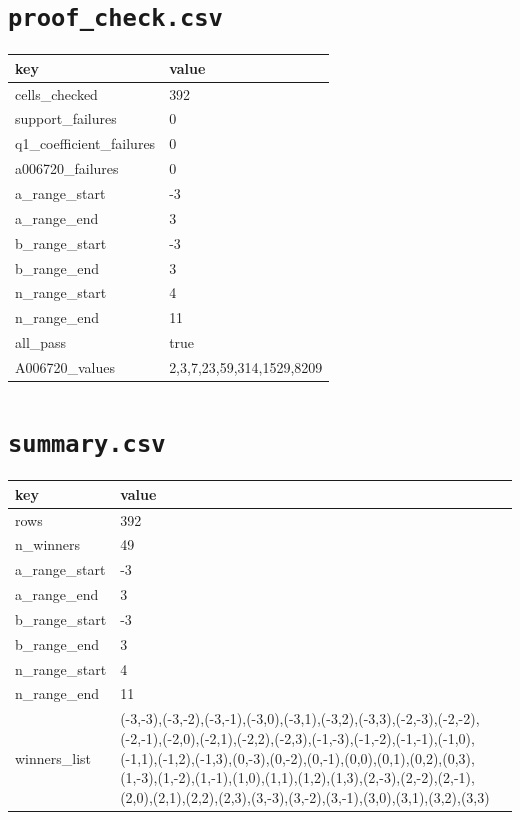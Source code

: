 \documentclass[10pt]{article}
\begin{document}
\section*{\texttt{proof\_check.csv}}
{\footnotesize
\begin{longtable}{@{}ll@{}}
\toprule
\textbf{key} & \textbf{value} \\
\midrule\endhead
cells\_checked & 392 \\
support\_failures & 0 \\
q1\_coefficient\_failures & 0 \\
a006720\_failures & 0 \\
a\_range\_start & -3 \\
a\_range\_end & 3 \\
b\_range\_start & -3 \\
b\_range\_end & 3 \\
n\_range\_start & 4 \\
n\_range\_end & 11 \\
all\_pass & true \\
A006720\_values & 2,3,7,23,59,314,1529,8209 \\
\bottomrule
\end{longtable}}


\section*{\texttt{summary.csv}}
{\footnotesize
\begin{longtable}{@{}ll@{}}
\toprule
\textbf{key} & \textbf{value} \\
\midrule\endhead
rows & 392 \\
n\_winners & 49 \\
a\_range\_start & -3 \\
a\_range\_end & 3 \\
b\_range\_start & -3 \\
b\_range\_end & 3 \\
n\_range\_start & 4 \\
n\_range\_end & 11 \\
winners\_list & (-3,-3),(-3,-2),(-3,-1),(-3,0),(-3,1),(-3,2),(-3,3),(-2,-3),(-2,-2),(-2,-1),(-2,0),(-2,1),(-2,2),(-2,3),(-1,-3),(-1,-2),(-1,-1),(-1,0),(-1,1),(-1,2),(-1,3),(0,-3),(0,-2),(0,-1),(0,0),(0,1),(0,2),(0,3),(1,-3),(1,-2),(1,-1),(1,0),(1,1),(1,2),(1,3),(2,-3),(2,-2),(2,-1),(2,0),(2,1),(2,2),(2,3),(3,-3),(3,-2),(3,-1),(3,0),(3,1),(3,2),(3,3) \\
\bottomrule
\end{longtable}}
\end{document}
